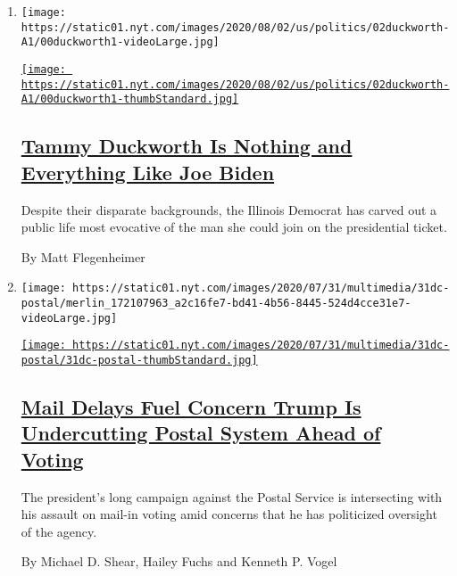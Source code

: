 \begin{enumerate}
\def\labelenumi{\arabic{enumi}.}
\item
  \texttt{[image: https://static01.nyt.com/images/2020/08/02/us/politics/02duckworth-A1/00duckworth1-videoLarge.jpg]}

  \href{/2020/08/01/us/politics/tammy-duckworth-biden-vp.html}{\texttt{[image: https://static01.nyt.com/images/2020/08/02/us/politics/02duckworth-A1/00duckworth1-thumbStandard.jpg]}}

  \hypertarget{tammy-duckworth-is-nothing-and-everything-like-joe-biden}{%
  \subsection{\texorpdfstring{\href{/2020/08/01/us/politics/tammy-duckworth-biden-vp.html}{Tammy
  Duckworth Is Nothing and Everything Like Joe
  Biden}}{Tammy Duckworth Is Nothing and Everything Like Joe Biden}}\label{tammy-duckworth-is-nothing-and-everything-like-joe-biden}}

  Despite their disparate backgrounds, the Illinois Democrat has carved
  out a public life most evocative of the man she could join on the
  presidential ticket.

  By Matt Flegenheimer
\item
  \texttt{[image: https://static01.nyt.com/images/2020/07/31/multimedia/31dc-postal/merlin\_172107963\_a2c16fe7-bd41-4b56-8445-524d4cce31e7-videoLarge.jpg]}

  \href{/2020/07/31/us/politics/trump-usps-mail-delays.html}{\texttt{[image: https://static01.nyt.com/images/2020/07/31/multimedia/31dc-postal/31dc-postal-thumbStandard.jpg]}}

  \hypertarget{mail-delays-fuel-concern-trump-is-undercutting-postal-system-ahead-of-voting}{%
  \subsection{\texorpdfstring{\href{/2020/07/31/us/politics/trump-usps-mail-delays.html}{Mail
  Delays Fuel Concern Trump Is Undercutting Postal System Ahead of
  Voting}}{Mail Delays Fuel Concern Trump Is Undercutting Postal System Ahead of Voting}}\label{mail-delays-fuel-concern-trump-is-undercutting-postal-system-ahead-of-voting}}

  The president's long campaign against the Postal Service is
  intersecting with his assault on mail-in voting amid concerns that he
  has politicized oversight of the agency.

  By Michael D. Shear, Hailey Fuchs and Kenneth P. Vogel
\end{enumerate}

